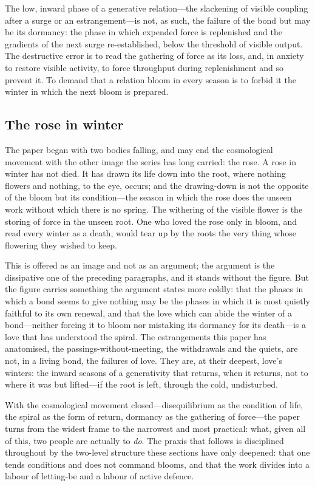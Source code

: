 \begin{claim}
The low, inward phase of a generative relation---the slackening of visible coupling after a surge or an estrangement---is not, as such, the failure of the bond but may be its dormancy: the phase in which expended force is replenished and the gradients of the next surge re-established, below the threshold of visible output. The destructive error is to read the gathering of force as its loss, and, in anxiety to restore visible activity, to force throughput during replenishment and so prevent it. To demand that a relation bloom in every season is to forbid it the winter in which the next bloom is prepared.
\end{claim}

\subsection{The rose in winter}
\label{p17:sub:rose-winter}

The paper began with two bodies falling, and may end the cosmological movement with the other image the series has long carried: the rose. A rose in winter has not died. It has drawn its life down into the root, where nothing flowers and nothing, to the eye, occurs; and the drawing-down is not the opposite of the bloom but its condition---the season in which the rose does the unseen work without which there is no spring. The withering of the visible flower is the storing of force in the unseen root. One who loved the rose only in bloom, and read every winter as a death, would tear up by the roots the very thing whose flowering they wished to keep.

This is offered as an image and not as an argument; the argument is the dissipative one of the preceding paragraphs, and it stands without the figure. But the figure carries something the argument states more coldly: that the phases in which a bond seems to give nothing may be the phases in which it is most quietly faithful to its own renewal, and that the love which can abide the winter of a bond---neither forcing it to bloom nor mistaking its dormancy for its death---is a love that has understood the spiral. The estrangements this paper has anatomised, the passings-without-meeting, the withdrawals and the quiets, are not, in a living bond, the failures of love. They are, at their deepest, love's winters: the inward seasons of a generativity that returns, when it returns, not to where it was but lifted---if the root is left, through the cold, undisturbed.

\noindent
With the cosmological movement closed---disequilibrium as the condition of life, the spiral as the form of return, dormancy as the gathering of force---the paper turns from the widest frame to the narrowest and most practical: what, given all of this, two people are actually to \emph{do}. The praxis that follows is disciplined throughout by the two-level structure these sections have only deepened: that one tends conditions and does not command blooms, and that the work divides into a labour of letting-be and a labour of active defence.
